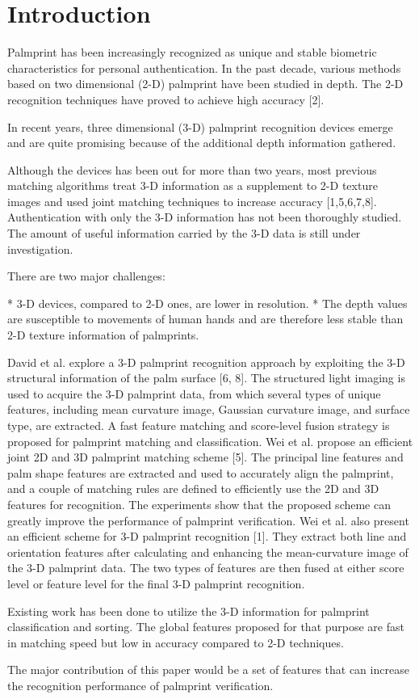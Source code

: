 
\chapter{Introduction\label{ch:intro}}

Palmprint has been increasingly recognized as unique and stable biometric characteristics for personal authentication. In the past decade, various methods based on two dimensional (2-D) palmprint have been studied in depth. The 2-D recognition techniques have proved to achieve high accuracy [2].

In recent years, three dimensional (3-D) palmprint recognition devices emerge and are quite promising because of the additional depth information gathered.

Although the devices has been out for more than two years, most previous matching algorithms treat 3-D information as a supplement to 2-D texture images and used joint matching techniques to increase accuracy [1,5,6,7,8]. Authentication with only the 3-D information has not been thoroughly studied. The amount of useful information carried by the 3-D data is still under investigation.

There are two major challenges:

* 3-D devices, compared to 2-D ones, are lower in resolution.
* The depth values are susceptible to movements of human hands and are therefore less stable than 2-D texture information of palmprints.

David et al. explore a 3-D palmprint recognition approach by exploiting the 3-D structural information of the palm surface [6, 8]. The structured light imaging is used to acquire the 3-D palmprint data, from which several types of unique features, including mean curvature image, Gaussian curvature image, and surface type, are extracted. A fast feature matching and score-level fusion strategy is proposed for palmprint matching and classification. Wei et al. propose an efficient joint 2D and 3D palmprint matching scheme [5]. The principal line features and palm shape features are extracted and used to accurately align the palmprint, and a couple of matching rules are defined to efficiently use the 2D and 3D features for recognition. The experiments show that the proposed scheme can greatly improve the performance of palmprint verification. Wei et al. also present an efficient scheme for 3-D palmprint recognition [1]. They extract both line and orientation features after calculating and enhancing the mean-curvature image of the 3-D palmprint data. The two types of features are then fused at either score level or feature level for the final 3-D palmprint recognition.

Existing work has been done to utilize the 3-D information for palmprint classification and sorting. The global features proposed for that purpose are fast in matching speed but low in accuracy compared to 2-D techniques.

The major contribution of this paper would be a set of features that can increase the recognition performance of palmprint verification.
